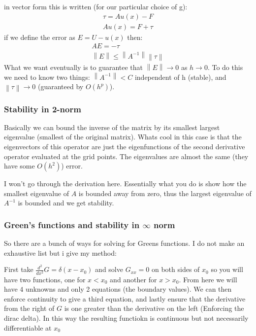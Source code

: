 \documentclass[12pt]{article}
\newcommand{\norm}[1]{\left\lVert#1\right\rVert}
\begin{document}
in vector form this is written (for our particular choice of g):
\begin{align}
	\tau=Au(x)-F \\
	Au(x)=F+\tau
\end{align}
if we define the error as $E=U-u(x)$ then:
\begin{align}
	AE=-\tau \\
	\norm{E}\leq \norm{A^{-1}}\norm{\tau}
\end{align}
What we want eventually is to guarantee that $\norm{E}\rightarrow 0$ as $h\rightarrow 0$. To do this we need to know two things: $\norm{A^{-1}}<C$ independent of h (stable), and $\norm{\tau}\rightarrow 0$ (guaranteed by $O(h^p)$).

\subsubsection{Stability in 2-norm}
Basically we can bound the inverse of the matrix by its smallest largest eigenvalue (smallest of the original matrix). Whats cool in this case is that the eigenvectors of this operator are just the eigenfunctions of the second derivative operator evaluated at the grid points. The eigenvalues are almost the same (they have some $O(h^2)$) error.

I won't go through the derivation here. Essentially what you do is show how the smallest eigenvalue of $A$ is bounded away from zero, thus the largest eigenvalue of $A^{-1}$ is bounded and we get stability.

\subsubsection{Green's functions and stability in $\infty$ norm}

So there are a bunch of ways for solving for Greens functions. I do not make an exhaustive list but i give my method:

First take $\frac{d^2}{dx^2}G=\delta (x-x_0)$ and solve $G_{xx}=0$ on both sides of $x_0$ so you will have two functions, one for $x<x_0$ and another for $x>x_0$. From here we will have $4$ unknowns and only 2 equations (the boundary values). We can then enforce continuity to give a third equation, and lastly ensure that  the derivative from the right of $G$ is one greater than the derivative on the left (Enforcing the dirac delta). In this way the resulting functiokn is continuous but not necessarily differentiable at $x_0$
\end{document}
